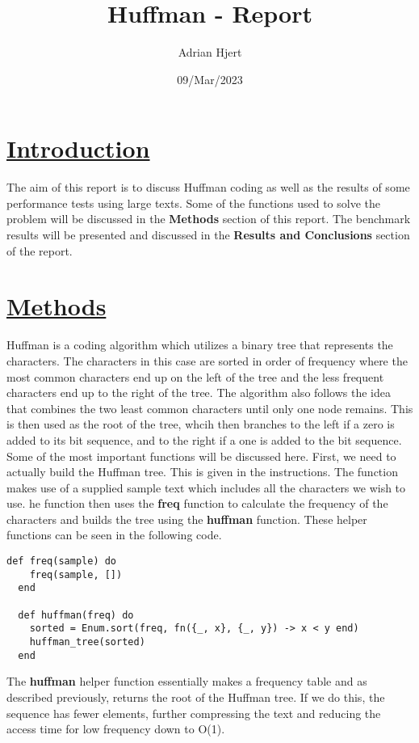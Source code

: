 \documentclass[a4paper,11pt]{article}
\begin{document}
\title{
	\textbf{Huffman - Report}
}
\author{Adrian Hjert}
\date{09/Mar/2023}

\maketitle

\section*{
	\underline{Introduction}
	}
The aim of this report is to discuss Huffman coding as well as the results of some performance tests using large texts. Some of the functions used to solve the problem will be discussed in the \textbf{Methods} section of this report. The benchmark results will be presented and discussed in the \textbf{Results and Conclusions} section of the report.
	
	
	
	
	
\section*{
	\underline{Methods}
	}
Huffman is a coding algorithm which utilizes a binary tree that represents the characters. The characters in this case are sorted in order of frequency where the most common characters end up on the left of the tree and the less frequent characters end up to the right of the tree. The algorithm also follows the idea that combines the two least common characters until only one node remains. This is then used as the root of the tree, whcih then branches to the left if a zero is added to its bit sequence, and to the right if a one is added to the bit sequence. Some of the most important functions will be discussed here. 
First, we need to actually build the Huffman tree. This is given in the instructions. The function makes use of a supplied sample text which includes all the characters we wish to use. he function then uses the \textbf{freq} function to calculate the frequency of the characters and builds the tree using the \textbf{huffman} function. These helper functions can be seen in the following code.
\begin{verbatim}
def freq(sample) do
    freq(sample, [])
  end
  
  def huffman(freq) do
    sorted = Enum.sort(freq, fn({_, x}, {_, y}) -> x < y end)
    huffman_tree(sorted)
  end
  \end{verbatim}
The \textbf{huffman} helper function essentially makes a frequency table and as described previously, returns the root of the Huffman tree. If we do this, the sequence has fewer elements, further compressing the text and reducing the access time for low frequency down to O(1). 
\end{document}
